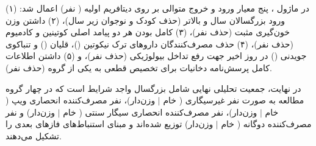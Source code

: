 \documentclass[12pt]{exam}
\begin{document}
در ماژول ، پنج معیار ورود و خروج متوالی بر روی دیتافریم اولیه ( نفر) اعمال شد: (۱) ورود بزرگسالان  سال و بالاتر (حذف  کودک و نوجوان زیر  سال)، (۲) داشتن وزن خون‌گیری مثبت  (حذف  نفر)، (۳) کامل بودن هر دو پیامد اصلی کوتینین  و کادمیوم  (حذف  نفر)، (۴) حذف مصرف‌کنندگان داروهای ترک نیکوتین ()، قلیان () و تنباکوی جویدنی () در  روز اخیر جهت رفع تداخل بیولوژیکی (حذف  نفر)، و (۵) داشتن اطلاعات کامل پرسش‌نامه دخانیات برای تخصیص قطعی به یکی از  گروه (حذف  نفر).

\begin{table}[htbp]
\centering
\caption{جریان تعریف جمعیت تحلیلی و تعداد دقیق افراد حذف‌شده در هر مرحله}
\end{table}

در نهایت، جمعیت تحلیلی نهایی شامل  بزرگسال واجد شرایط است که در چهار گروه مطالعه به صورت  نفر غیرسیگاری ( خام $\mid$  وزن‌دار)،  نفر مصرف‌کننده انحصاری ویپ ( خام $\mid$  وزن‌دار)،  نفر مصرف‌کننده انحصاری سیگار سنتی ( خام $\mid$  وزن‌دار) و  نفر مصرف‌کننده دوگانه ( خام $\mid$  وزن‌دار) توزیع شده‌اند و مبنای استنباط‌های فازهای بعدی را تشکیل می‌دهند.
\end{document}
